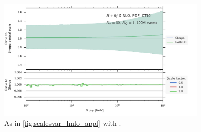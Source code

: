 %
\begin{figure}
	\centering
	\includegraphics[width=0.9\textwidth]{images/scalesvar_hnlo_fnlo.pdf}
	\caption{As in \cref{fig:scalesvar_hnlo_appl} with \fnlo{}.}
	\label{fig:scalesvar_hnlo_fnlo}
\end{figure}
%


